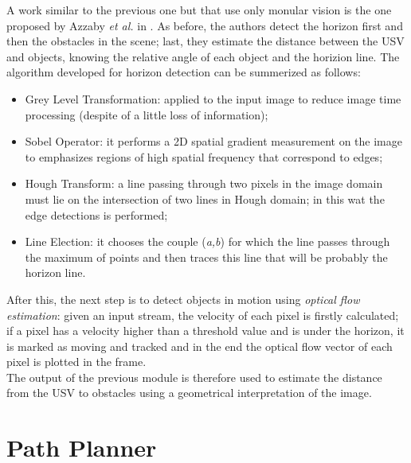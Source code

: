 \documentclass[journal]{IEEEtran}
\begin{document}
      \indent A work similar to the previous one but that use only monular vision is the one proposed by Azzaby \textit{et al.} in \cite{Azzabi}. As before, the authors detect the horizon first and then the obstacles in the scene; last, they estimate the distance between the USV and objects, knowing the relative angle of each object and the horizion line. The algorithm developed for horizon detection can be summerized as follows:
            \begin{itemize}
                  \item Grey Level Transformation: applied to the input image to reduce image time processing (despite of a little loss of information);
                  \item Sobel Operator: it performs a 2D spatial gradient measurement on the image to emphasizes regions of high spatial frequency that correspond to edges;
                  \item Hough Transform: a line passing through two pixels in the image domain must lie on the intersection of two lines in Hough domain; in this wat the edge detections is performed;
                  \item Line Election: it chooses the couple (\textit{a,b}) for which the line passes through the maximum of points and then traces this line that will be probably the horizon line.
            \end{itemize}
      \indent After this, the next step is to detect objects in motion using \textit{optical flow estimation}: given an input stream, the velocity of each pixel is firstly calculated; if a pixel has a velocity higher than a threshold value and is under the horizon, it is marked as moving and tracked and in the end the optical flow vector of each pixel is plotted in the frame.\\
      \indent The output of the previous module is therefore used to estimate the distance from the USV to obstacles using a geometrical interpretation of the image.

\section{Path Planner} \label{path_planner}
\end{document}
